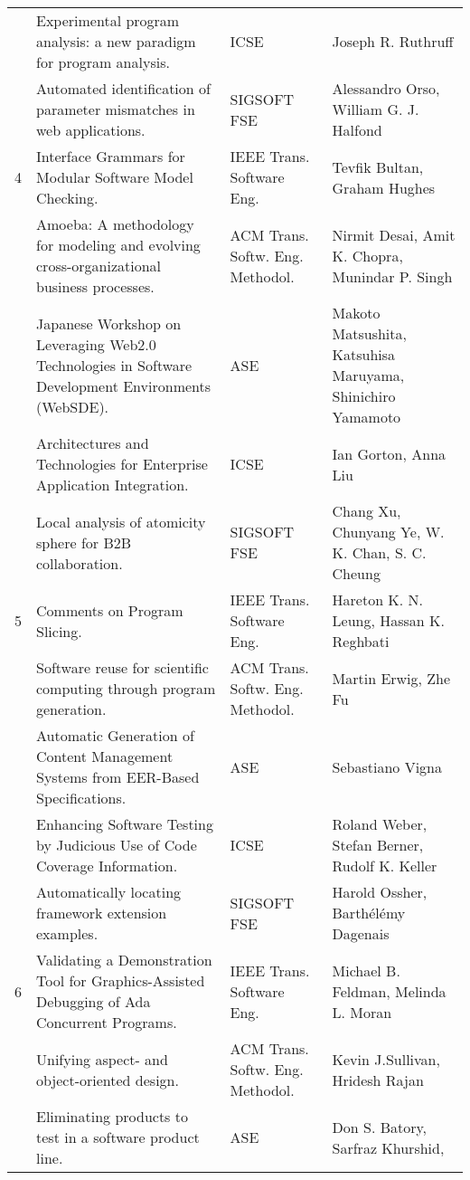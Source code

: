 \begin{table}[h]
{\begin{tabular}{|llll|}
 & Experimental program analysis: a new paradigm for program analysis.& ICSE& Joseph R. Ruthruff \\
\rowcolor{black!20} & Automated identification of parameter mismatches in web applications.& SIGSOFT 
FSE& Alessandro Orso, William G. J. Halfond \\
4 & Interface Grammars for Modular Software Model Checking.& IEEE Trans. Software Eng.& Tevfik 
Bultan, Graham Hughes \\
\rowcolor{black!20} & Amoeba: A methodology for modeling and evolving cross-organizational business 
processes.& ACM Trans. Softw. Eng. Methodol.& Nirmit Desai, Amit K. Chopra, Munindar P. Singh \\
 & Japanese Workshop on Leveraging Web2.0 Technologies in Software Development Environments 
(WebSDE).& ASE& Makoto Matsushita, Katsuhisa Maruyama, Shinichiro Yamamoto \\
\rowcolor{black!20} & Architectures and Technologies for Enterprise Application Integration.& ICSE& 
Ian Gorton, Anna Liu \\
 & Local analysis of atomicity sphere for B2B collaboration.& SIGSOFT FSE& Chang Xu, Chunyang Ye, W. 
K. Chan, S. C. Cheung \\
\rowcolor{black!20} 5 & Comments on Program Slicing.& IEEE Trans. Software Eng.& Hareton K. N. 
Leung, Hassan K. Reghbati \\
 & Software reuse for scientific computing through program generation.& ACM Trans. Softw. Eng. 
Methodol.& Martin Erwig, Zhe Fu \\
\rowcolor{black!20} & Automatic Generation of Content Management Systems from EER-Based 
Specifications.& ASE& Sebastiano Vigna \\
 & Enhancing Software Testing by Judicious Use of Code Coverage Information.& ICSE& Roland Weber, 
Stefan Berner, Rudolf K. Keller \\
\rowcolor{black!20} & Automatically locating framework extension examples.& SIGSOFT FSE& Harold 
Ossher, Barthélémy Dagenais \\
6 & Validating a Demonstration Tool for Graphics-Assisted Debugging of Ada Concurrent Programs.& 
IEEE Trans. Software Eng.& Michael B. Feldman, Melinda L. Moran \\
\rowcolor{black!20} & Unifying aspect- and object-oriented design.& ACM Trans. Softw. Eng. 
Methodol.& Kevin J.Sullivan, Hridesh Rajan \\
 & Eliminating products to test in a software product line.& ASE& Don S. Batory, Sarfraz Khurshid, 

\end{tabular}}
\end{table}
